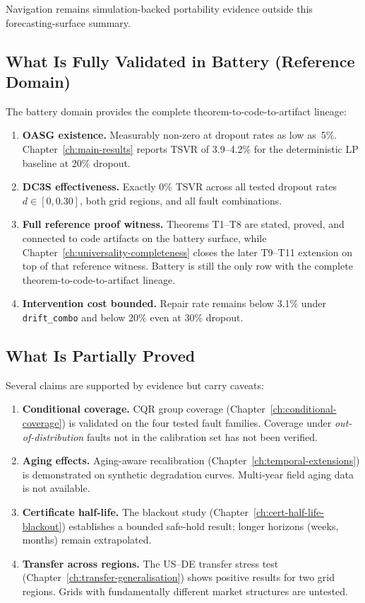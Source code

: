 Navigation remains simulation-backed portability evidence outside this
forecasting-surface summary.

\subsection{What Is Fully Validated in Battery (Reference Domain)}

The battery domain provides the complete theorem-to-code-to-artifact lineage:

\begin{enumerate}
  \item \textbf{OASG existence.}  Measurably non-zero at dropout rates
    as low as~5\%.  Chapter~\ref{ch:main-results} reports TSVR of
    3.9--4.2\% for the deterministic LP baseline at 20\% dropout.
  \item \textbf{DC3S effectiveness.}  Exactly 0\% TSVR across all tested
    dropout rates $d \in [0, 0.30]$, both grid regions, and all fault combinations.
  \item \textbf{Full reference proof witness.}  Theorems T1--T8 are stated,
    proved, and connected to code artifacts on the battery surface, while
    Chapter~\ref{ch:universality-completeness} closes the later T9--T11
    extension on top of that reference witness.  Battery is still the only
    row with the complete theorem-to-code-to-artifact lineage.
  \item \textbf{Intervention cost bounded.}  Repair rate remains below
    3.1\% under \texttt{drift\_combo} and below 20\% even at 30\% dropout.
\end{enumerate}

\subsection{What Is Partially Proved}

Several claims are supported by evidence but carry caveats:

\begin{enumerate}
  \item \textbf{Conditional coverage.}  CQR group coverage
    (Chapter~\ref{ch:conditional-coverage}) is validated on the four
    tested fault families.  Coverage under \emph{out-of-distribution}
    faults not in the calibration set has not been verified.
  \item \textbf{Aging effects.}  Aging-aware recalibration
    (Chapter~\ref{ch:temporal-extensions}) is demonstrated on synthetic
    degradation curves.  Multi-year field aging data is not available.
  \item \textbf{Certificate half-life.}  The blackout study
    (Chapter~\ref{ch:cert-half-life-blackout}) establishes a bounded
    safe-hold result; longer horizons (weeks, months) remain extrapolated.
  \item \textbf{Transfer across regions.}  The US--DE transfer stress
    test (Chapter~\ref{ch:transfer-generalisation}) shows positive
    results for two grid regions.  Grids with fundamentally different
    market structures are untested.
\end{enumerate}

